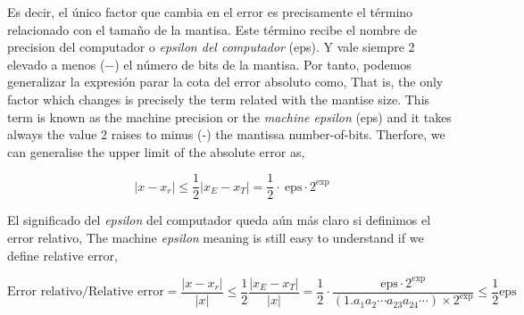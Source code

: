 \begin{paracol}{2}
 Es decir, el único factor que cambia en el error es precisamente el término relacionado con el tamaño de la mantisa. Este término recibe el nombre de precision del computador o \emph{epsilon del computador} (eps). Y vale siempre 2 elevado a menos ($-$) el  número de bits de la mantisa. Por tanto, podemos generalizar la expresión parar la cota del error absoluto como,
\switchcolumn
{} That is, the only factor which changes is precisely the term related with the mantise size. This term is known as the machine precision or the \emph{machine epsilon} (eps) and it takes always the value 2 raises to minus (-) the mantissa number-of-bits. Therfore, we can generalise the upper limit of the absolute error as,   
\end{paracol}
  \begin{equation*}
\vert x-x_r \vert \leq \frac{1}{2}\vert x_E-x_T \vert= \frac{1}{2}\cdot\ \text{eps}\cdot2^\text{exp}
\end{equation*}
\begin{paracol}{2}
El significado del \emph{epsilon} del computador queda aún más claro si definimos el error relativo,
\switchcolumn
The machine \emph{epsilon} meaning is still easy to understand  if we define relative error,
\end{paracol}
\begin{equation*}
\text{Error relativo/Relative error}=\frac{\vert x-x_r \vert}{\vert x \vert} \leq \frac{1}{2}\frac{\vert x_E-x_T \vert}{\vert x \vert}= \frac{1}{2}\cdot \frac{\text{eps}\cdot2^\text{exp}}{(1.a_1a_2\cdots a_{23}a_{24}\cdots)\times2^{\text{exp}}}\leq \frac{1}{2}\text{eps}
\end{equation*}
